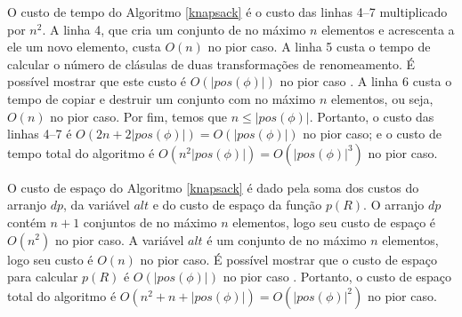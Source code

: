 \indent

O custo de tempo do Algoritmo \ref{knapsack} é o custo das linhas 4--7 multiplicado por $n^2$. A linha 4, que cria um conjunto de no máximo $n$ elementos e acrescenta a ele um novo elemento, custa $O(n)$ no pior caso. A linha 5 custa o tempo de calcular o número de clásulas de duas transformações de renomeamento. É possível mostrar que este custo é $O(|pos(\phi)|)$ no pior caso \cite{nonnengart2001computing}. A linha 6 custa o tempo de copiar e destruir um conjunto com no máximo $n$ elementos, ou seja, $O(n)$ no pior caso. Por fim, temos que $n \leq |pos(\phi)|$. Portanto, o custo das linhas 4--7 é $O(2n + 2|pos(\phi)|) = O(|pos(\phi)|)$ no pior caso; e o custo de tempo total do algoritmo é $O(n^2 |pos(\phi)|) = O(|pos(\phi)|^3)$ no pior caso.

O custo de espaço do Algoritmo \ref{knapsack} é dado pela soma dos custos do arranjo $dp$, da variável $alt$ e do custo de espaço da função $p(R)$. O arranjo $dp$ contém $n+1$ conjuntos de no máximo $n$ elementos, logo seu custo de espaço é $O(n^2)$ no pior caso. A variável $alt$ é um conjunto de no máximo $n$ elementos, logo seu custo é $O(n)$ no pior caso. É possível mostrar que o custo de espaço para calcular $p(R)$ é $O(|pos(\phi)|)$ no pior caso \cite{nonnengart2001computing}. Portanto, o custo de espaço total do algoritmo é $O(n^2 + n + |pos(\phi)|) = O(|pos(\phi)|^2)$ no pior caso.
